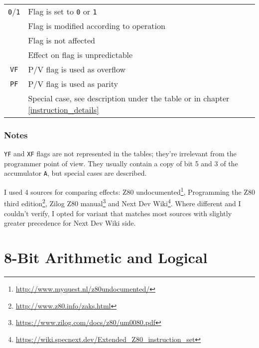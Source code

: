 \documentclass[12pt,twoside,openright,a4paper]{book}
\begin{document}
\begin{tabular}{cl}
	{\tt 0}/{\tt 1} & Flag is set to {\tt 0} or {\tt 1} \\
	{\tt \FS} & Flag is modified according to operation \\
	{\tt \FN} & Flag is not affected \\
	{\tt \FU} & Effect on flag is unpredictable \\
	{\tt VF} & P/V flag is used as overflow \\
	{\tt PF} & P/V flag is used as parity \\
	{\tt \FX} & Special case, see description under the table or in chapter \ref{instruction_details}
\end{tabular}

\subsubsection{Notes}

{\tt YF} and {\tt XF} flags are not represented in the tables; they're irrelevant from the programmer point of view. They usually contain a copy of bit 5 and 3 of the accumulator {\tt A}, but special cases are described.
	
I used 4 sources for comparing effects: Z80 undocumented\footnote{\url{http://www.myquest.nl/z80undocumented/}}, Programming the Z80 third edition\footnote{\url{http://www.z80.info/zaks.html}}, Zilog Z80 manual\footnote{\url{https://www.zilog.com/docs/z80/um0080.pdf}} and Next Dev Wiki\footnote{\url{https://wiki.specnext.dev/Extended_Z80_instruction_set}}. Where different and I couldn't verify, I opted for variant that matches most sources with slightly greater precedence for Next Dev Wiki side.


\pagebreak

\section{8-Bit Arithmetic and Logical}
\end{document}
